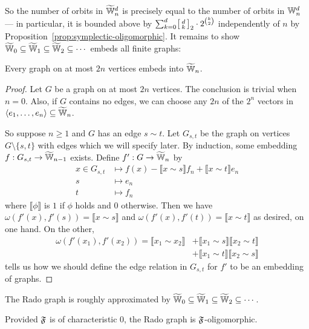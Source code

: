 So the number of orbits in $\widetilde {\mathbb{W}}_n^d$ is precisely equal to the number of orbits in $\mathbb{W}_n^d$
--- in particular, it is bounded above by $\sum_{k=0}^d \begin{bsmallmatrix}d \\ k\end{bsmallmatrix}_2 \cdot 2^{\binom{k}{2}}$ independently of $n$ by Proposition~\ref{prop:symplectic-oligomorphic}.
It remains to show $\widetilde {\mathbb{W}}_0 \subseteq \widetilde {\mathbb{W}}_1 \subseteq \widetilde {\mathbb{W}}_2 \subseteq \cdots$ embeds all finite graphs:

\begin{proposition}[{\cite[Theorem~8.11.2]{GR01}}]
    Every graph on at most $2n$ vertices embeds into $\widetilde {\mathbb{W}}_n$.
\end{proposition}
\begin{proof}
    Let $G$ be a graph on at most $2n$ vertices. 
    The conclusion is trivial when $n = 0$.
    Also, if $G$ contains no edges, we can choose any $2n$ of the $2^n$ vectors in 
    $\langle e_1, \ldots, e_n \rangle \subseteq \widetilde {\mathbb{W}}_n$.
    
    So suppose $n \geq 1$ and $G$ has an edge $s \sim t$.
    Let $G_{s,t}$ be the graph on vertices $G \setminus \{s, t\}$ with edges which we will specify later.
    By induction, some embedding $f : G_{s, t} \to \widetilde {\mathbb{W}}_{n-1}$ exists.
    Define $f' : G \to \widetilde {\mathbb{W}}_n$ by
    \begin{align*}
        x \in G_{s, t} &\mapsto f(x) - \llbracket x \sim s \rrbracket f_n + \llbracket x \sim t \rrbracket e_n \\
        s &\mapsto e_n \\
        t &\mapsto f_n
    \end{align*}
    where $\llbracket \phi \rrbracket$ is $1$ if $\phi$ holds and $0$ otherwise.
    Then we have $\omega(f'(x), f'(s)) = \llbracket x \sim s \rrbracket$ 
    and $\omega(f'(x), f'(t)) = \llbracket x \sim t \rrbracket$ as desired, on one hand.
    On the other,
    \begin{align*}
        \omega( f'(x_1), f'(x_2) ) 
        = \llbracket x_1 \sim x_2 \rrbracket 
        &+ \llbracket x_1 \sim s \rrbracket \llbracket x_2 \sim t \rrbracket \\
        &+ \llbracket x_1 \sim t \rrbracket \llbracket x_2 \sim s \rrbracket
    \end{align*}
    tells us how we should define the edge relation in $G_{s,t}$ for $f'$ to be an embedding of graphs.
\end{proof}

\begin{theorem}
    The Rado graph is roughly approximated by $\widetilde {\mathbb{W}}_0 \subseteq \widetilde {\mathbb{W}}_1 \subseteq \widetilde {\mathbb{W}}_2 \subseteq \cdots$.
\end{theorem}

\begin{corollary}
    Provided $\mathfrak{F}$ is of characteristic $0$, the Rado graph is $\mathfrak{F}$-oligomorphic.
\end{corollary}
